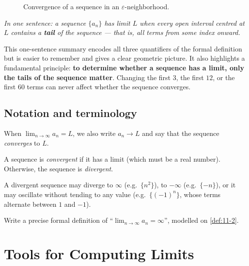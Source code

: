 \begin{figure}[ht]
  \centering
  
  \caption{Convergence of a sequence in an $\varepsilon$-neighborhood.}
  \label{fig:sequence-epsilon-neighborhood}
\end{figure}

\textit{In one sentence: a sequence $\{a_{n}\}$ has limit $L$ when every open interval centred at $L$ contains a \textbf{tail} of the sequence --- that is, all terms from some index onward.}

\begin{remark}
This one-sentence summary encodes all three quantifiers of the formal definition but is easier to remember and gives a clear geometric picture.  It also highlights a fundamental principle: \textbf{to determine whether a sequence has a limit, only the tails of the sequence matter}.  Changing the first $3$, the first $12$, or the first $60$ terms can never affect whether the sequence converges.
\end{remark}

\subsection*{Notation and terminology}

When $\lim_{n\to\infty}a_{n}=L$, we also write $a_{n}\to L$ and say that the sequence \emph{converges} to $L$.

\begin{definition}
\label{def:11-3}
A sequence is \emph{convergent} if it has a limit (which must be a real number).  Otherwise, the sequence is \emph{divergent}.
\end{definition}

A divergent sequence may diverge to $\infty$ (e.g.\ $\{n^{2}\}$), to $-\infty$ (e.g.\ $\{-n\}$), or it may oscillate without tending to any value (e.g.\ $\{(-1)^{n}\}$, whose terms alternate between $1$ and $-1$).

\begin{remark}
Write a precise formal definition of ``$\lim_{n\to\infty}a_{n}=\infty$'', modelled on \cref{def:11-2}.
\end{remark}

\section{Tools for Computing Limits}
\label{sec:11.3}

